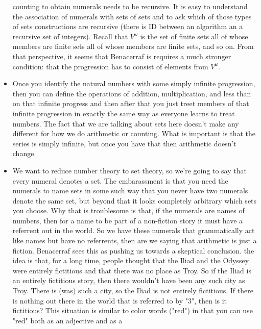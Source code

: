 \documentclass[12pt]{article}
\theoremstyle{definition}
\begin{document}
\begin{itemize}
        counting to obtain numerals needs to be recursive. It is easy to
        understand the association of numerals with sets of sets and to ask
        which of those types of sets constructions are recursive (there is ID
        between an algorithm an a recursive set of integers). Recall that
        $V^\omega$ is the set of finite sets all of whose members are finite
        sets all of whose members are finite sets, and so on. From that
        perspective, it seems that Benacerraf is requires a much stronger
        condition: that the progression has to consist of elements from
        $V^\omega$. 
    \item
        Once you identify the natural numbers with some simply infinite
        progression, then you can define the operations of addition,
        multiplication, and less than on that infinite progress and then after
        that you just treet members of that infinite progression in exactly the
        same way as everyone learns to treat numbers. The fact that we are
        talking about sets here doesn't make any different for how we do
        arithmetic or counting. What is important is that the series is simply
        infinite, but once you have that then arithmetic doesn't change.
    \item
        We want to reduce number theory to set theory, so we're going to say
        that every numeral denotes a set. The embarassment is that you need the
        numerals to name sets in some such way that you never have two numerals
        denote the same set, but beyond that it looks completely arbitrary
        which sets you choose. Why that is troublesome is that, if the numerals
        are names of numbers, then for a name to be part of a non-fiction story
        it must have a referrent out in the world. So we have these numerals
        that grammatically act like names but have no referrents, then are we
        saying that arithmetic is just a fiction. Benacerraf sees this as
        pushing us towards a skeptical conclusion. the idea is that, for a long
        time, people thought that the Iliad and the Odyssey were entirely
        fictitious and that there was no place as Troy. So if the Iliad is an
        entirely fictitious story, then there wouldn't have been any such city
        as Troy. There is (was) such a city, so the Iliad is not entirely
        fictitious. If there is nothing out there in the world that is referred
        to by "3", then is it fictitious? This situation is similar to color
        words ("red") in that you can use "red" both as an adjective and as a

\end{itemize}
\end{document}
